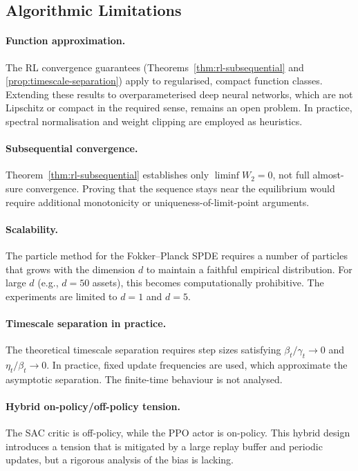 \subsection{Algorithmic Limitations}

\paragraph{Function approximation.} The RL convergence guarantees
(Theorems~\ref{thm:rl-subsequential} and \ref{prop:timescale-separation}) apply to
regularised, compact function classes. Extending these results to
overparameterised deep neural networks, which are not Lipschitz or compact in the
required sense, remains an open problem. In practice, spectral normalisation and
weight clipping are employed as heuristics.

\paragraph{Subsequential convergence.} Theorem~\ref{thm:rl-subsequential}
establishes only $\liminf W_2 = 0$, not full almost-sure convergence. Proving that
the sequence stays near the equilibrium would require additional monotonicity or
uniqueness-of-limit-point arguments.

\paragraph{Scalability.} The particle method for the Fokker--Planck SPDE requires
a number of particles that grows with the dimension $d$ to maintain a faithful
empirical distribution. For large $d$ (e.g., $d=50$ assets), this becomes
computationally prohibitive. The experiments are limited to $d=1$ and $d=5$.

\paragraph{Timescale separation in practice.} The theoretical timescale
separation requires step sizes satisfying $\beta_t/\gamma_t \to 0$ and
$\eta_t/\beta_t \to 0$. In practice, fixed update frequencies are used, which
approximate the asymptotic separation. The finite-time behaviour is not analysed.

\paragraph{Hybrid on-policy/off-policy tension.} The SAC critic is off-policy,
while the PPO actor is on-policy. This hybrid design introduces a tension that is
mitigated by a large replay buffer and periodic updates, but a rigorous analysis
of the bias is lacking.


